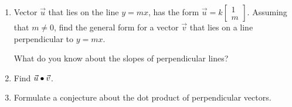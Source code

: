 \documentclass{ximera}
\begin{document}
\begin{problem}\label{prob:perpvectors3}
  \begin{enumerate}
    \item Vector $\vec{u}$ that lies on the line $y=mx$, has the form $\vec{u}=k\begin{bmatrix}1\\m\end{bmatrix}$.  Assuming that $m\neq 0$, find the general form for a vector $\vec{v}$ that lies on a line perpendicular to $y=mx$.
      \begin{hint}
        What do you know about the slopes of perpendicular
        lines?
      \end{hint}
    \item Find $\vec{u}\bullet \vec{v}$.
    \item Formulate a conjecture about the dot product of perpendicular vectors.
  \end{enumerate}
\end{problem}
\end{document}
